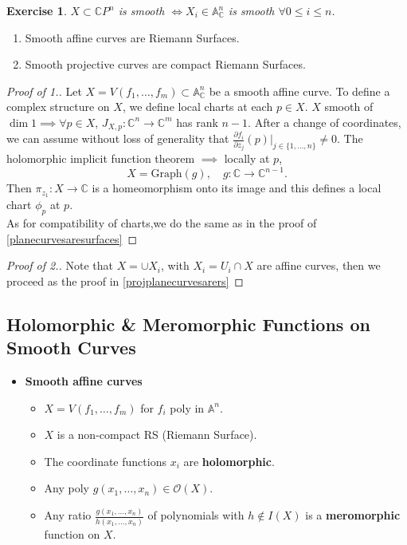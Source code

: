 \documentclass{article}
\newtheorem{exercise}{Exercise}
\begin{document}
\begin{exercise}
$X \subset \mathbb{C} P^n$ is smooth $\iff X_i \in \mathbb{A}_{\mathbb{C}}^n$ is smooth $\forall 0 \le i \le n$.
\end{exercise}

\begin{theorem} \label{curvesaresurfaces}
\begin{enumerate}[1.]
    \item Smooth affine curves are Riemann Surfaces.
    \item Smooth projective curves are compact Riemann Surfaces.
\end{enumerate}
\end{theorem}

\begin{proof}[Proof of 1.]
Let $X = V(f_1, \ldots, f_m) \subset \mathbb{A}_{\mathbb{C}}^n$ be a smooth affine curve.
To define a complex structure on $X$, we define local charts at each $p \in X$.
$X$ smooth of $\dim 1 \implies \forall p \in X$, $J_{X, p} : \mathbb{C}^n \to \mathbb{C}^m$ has rank $n-1$.
After a change of coordinates, we can assume without loss of generality that $\frac{\partial f_i}{\partial z_j} (p)|_{j \in \{ 1, \ldots, n \}} \ne 0$.
The holomorphic implicit function theorem $\implies$ locally at $p$,
$$
X = \text{Graph}(g), \quad g: \mathbb{C} \to \mathbb{C}^{n-1}.
$$
Then $\pi_{z_1}: X \to \mathbb{C}$ is a homeomorphism onto its image and this defines a local chart $\phi_p$ at $p$.\\
\noindent As for compatibility of charts,we do the same as in the proof of  \ref{planecurvesaresurfaces}

\end{proof}
\begin{proof}[Proof of 2.]
    Note that $X=\cup X_i$, with $X_i=U_i \cap X$ are affine curves, then we proceed as the proof in \ref{projplanecurvesarers}
\end{proof}

\subsection{Holomorphic \& Meromorphic Functions on Smooth Curves}

\begin{itemize}
    \item \textbf{Smooth affine curves}
    \begin{itemize}
        \item $X = V(f_1, \dots, f_m)$ for $f_i$ poly in $\mathbb{A}^n$.
        \item $X$ is a non-compact RS (Riemann Surface).
        \item The coordinate functions $x_i$ are \textbf{holomorphic}.
        \item Any poly $g(x_1, \dots, x_n) \in \mathcal{O}(X)$.
        \item Any ratio $\frac{g(x_1, \dots, x_n)}{h(x_1, \dots, x_n)}$ of polynomials with $h \notin I(X)$ is a \textbf{meromorphic} function on $X$.
    \end{itemize}
\end{itemize}
\end{document}
